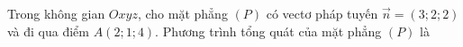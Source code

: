 \begin{ex}
Trong không gian $Oxyz$, cho mặt phẳng $(P)$ có vectơ pháp tuyến $\vec n=(3;2;2)$ và đi qua điểm $A(2;1;4)$. Phương trình tổng quát của mặt phẳng $(P)$ là
\end{ex}
